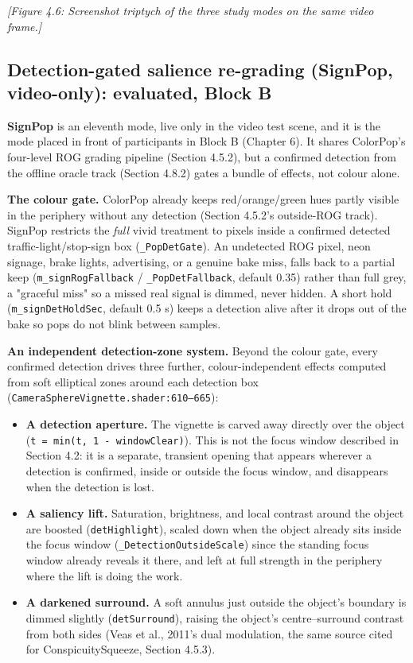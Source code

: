 \textit{[Figure 4.6: Screenshot triptych of the three study modes on the same video frame.]}

\subsection{Detection-gated salience re-grading (SignPop, video-only): evaluated, Block B}

\textbf{SignPop} is an eleventh mode, live only in the video test scene, and it is the mode placed in
front of participants in Block B (Chapter 6). It shares ColorPop's four-level ROG grading pipeline
(Section 4.5.2),
but a confirmed detection from the offline oracle track (Section 4.8.2) gates a bundle of effects,
not colour alone.

\textbf{The colour gate.} ColorPop already keeps red/orange/green hues partly visible in the
periphery without any detection (Section 4.5.2's outside-ROG track). SignPop restricts the
\textit{full} vivid treatment to pixels inside a confirmed detected traffic-light/stop-sign box
(\verb|_PopDetGate|). An undetected ROG pixel, neon signage, brake lights, advertising, or a
genuine bake miss, falls back to a partial keep (\verb|m_signRogFallback| / \verb|_PopDetFallback|,
default 0.35) rather than full grey, a "graceful miss" so a missed real signal is dimmed, never
hidden. A short hold (\verb|m_signDetHoldSec|, default 0.5 s) keeps a detection alive after it drops
out of the bake so pops do not blink between samples.

\textbf{An independent detection-zone system.} Beyond the colour gate, every confirmed detection
drives three further, colour-independent effects computed from soft elliptical zones around each
detection box (\verb|CameraSphereVignette.shader:610–665|):

\begin{itemize}
\item \textbf{A detection aperture.} The vignette is carved away directly over the object
  (\verb|t = min(t, 1 - windowClear)|). This is not the focus window described in Section 4.2: it
  is a separate, transient opening that appears wherever a detection is confirmed, inside or
  outside the focus window, and disappears when the detection is lost.
\item \textbf{A saliency lift.} Saturation, brightness, and local contrast around the object are
  boosted (\verb|detHighlight|), scaled down when the object already sits inside the focus window
  (\verb|_DetectionOutsideScale|) since the standing focus window already reveals it there, and
  left at full strength in the periphery where the lift is doing the work.
\item \textbf{A darkened surround.} A soft annulus just outside the object's boundary is dimmed
  slightly (\verb|detSurround|), raising the object's centre–surround contrast from both sides
  (Veas et al., 2011's dual modulation, the same source cited for ConspicuitySqueeze, Section 4.5.3).
\end{itemize}

